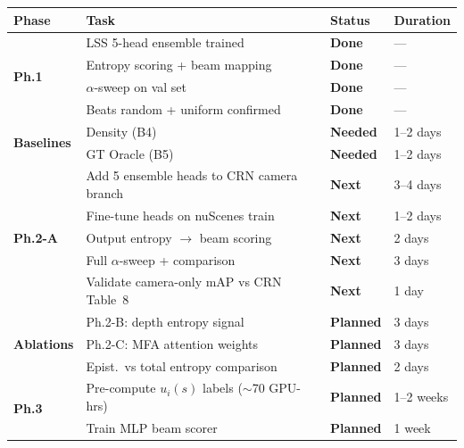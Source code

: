 \documentclass[12pt, a4paper]{article}
\theoremstyle{definition}
\begin{document}
\begin{center}
\renewcommand{\arraystretch}{1.4}
\begin{tabular}{llll}
  \toprule
  \textbf{Phase} & \textbf{Task} & \textbf{Status} & \textbf{Duration} \\
  \midrule
  \multirow{4}{*}{\textbf{Ph.1}}
  & LSS 5-head ensemble trained & \textcolor{donegreen}{\textbf{Done}} & --- \\
  & Entropy scoring + beam mapping & \textcolor{donegreen}{\textbf{Done}} & --- \\
  & $\alpha$-sweep on val set & \textcolor{donegreen}{\textbf{Done}} & --- \\
  & Beats random + uniform confirmed & \textcolor{donegreen}{\textbf{Done}} & --- \\
  \midrule
  \multirow{2}{*}{\textbf{Baselines}}
  & Density (B4) & \textcolor{inprogressorange}{\textbf{Needed}} & 1--2 days \\
  & GT Oracle (B5) & \textcolor{inprogressorange}{\textbf{Needed}} & 1--2 days \\
  \midrule
  \multirow{5}{*}{\textbf{Ph.2-A}}
  & Add 5 ensemble heads to CRN camera branch & \textcolor{inprogressorange}{\textbf{Next}} & 3--4 days \\
  & Fine-tune heads on nuScenes train & \textcolor{inprogressorange}{\textbf{Next}} & 1--2 days \\
  & Output entropy $\to$ beam scoring & \textcolor{inprogressorange}{\textbf{Next}} & 2 days \\
  & Full $\alpha$-sweep + comparison & \textcolor{inprogressorange}{\textbf{Next}} & 3 days \\
  & Validate camera-only mAP vs CRN Table~8 & \textcolor{inprogressorange}{\textbf{Next}} & 1 day \\
  \midrule
  \multirow{3}{*}{\textbf{Ablations}}
  & Ph.2-B: depth entropy signal & \textcolor{plannedpurple}{\textbf{Planned}} & 3 days \\
  & Ph.2-C: MFA attention weights & \textcolor{plannedpurple}{\textbf{Planned}} & 3 days \\
  & Epist.\ vs total entropy comparison & \textcolor{plannedpurple}{\textbf{Planned}} & 2 days \\
  \midrule
  \multirow{4}{*}{\textbf{Ph.3}}
  & Pre-compute $u_i(s)$ labels ($\sim$70 GPU-hrs) & \textcolor{plannedpurple}{\textbf{Planned}} & 1--2 weeks \\
  & Train MLP beam scorer & \textcolor{plannedpurple}{\textbf{Planned}} & 1 week \\

\end{tabular}
\end{center}
\end{document}

